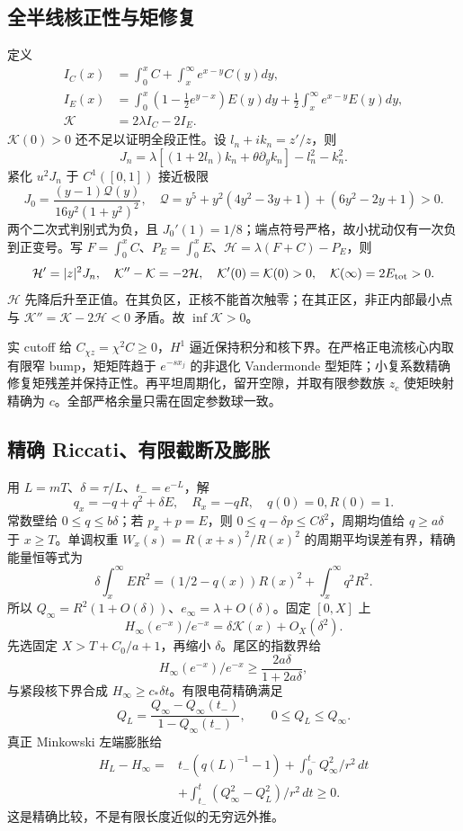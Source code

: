 \subsection{全半线核正性与矩修复}
定义
\begin{align*}
I_C(x)&=\int_0^xC+\int_x^\infty e^{x-y}C(y)dy,\\
I_E(x)&=\int_0^x(1-\tfrac12e^{y-x})E(y)dy
+\tfrac12\int_x^\infty e^{x-y}E(y)dy,\\
\mathcal K&=2\lambda I_C-2I_E.
\end{align*}
$\mathcal K(0)>0$ 还不足以证明全段正性。设 $l_n+ik_n=z'/z$，则
\[
J_n=\lambda[(1+2l_n)k_n+\theta\partial_yk_n]-l_n^2-k_n^2.
\]
紧化 $u^2J_n$ 于 $C^1([0,1])$ 接近极限
\[
J_0=\frac{(y-1)\mathcal Q(y)}{16y^2(1+y^2)^2},\quad
\mathcal Q=y^5+y^2(4y^2-3y+1)+(6y^2-2y+1)>0.
\]
两个二次式判别式为负，且 $J_0'(1)=1/8$；端点符号严格，故小扰动仅有一次负到正变号。写 $F=\int_0^xC$、$P_E=\int_0^xE$、$\mathcal H=\lambda(F+C)-P_E$，则
\[
\mathcal H'=|z|^2J_n,\quad
\mathcal K''-\mathcal K=-2\mathcal H,\quad
\mathcal K'(0)=\mathcal K(0)>0,
\quad\mathcal K(\infty)=2E_{\rm tot}>0.
\]
$\mathcal H$ 先降后升至正值。在其负区，正核不能首次触零；在其正区，非正内部最小点与 $\mathcal K''=\mathcal K-2\mathcal H<0$ 矛盾。故 $\inf\mathcal K>0$。

实 cutoff 给 $C_{\chi z}=\chi^2C\ge0$，$H^1$ 逼近保持积分和核下界。在严格正电流核心内取有限窄 bump，矩矩阵趋于 $e^{-sx_j}$ 的非退化 Vandermonde 型矩阵；小复系数精确修复矩残差并保持正性。再平坦周期化，留开空隙，并取有限参数族 $z_c$ 使矩映射精确为 $c$。全部严格余量只需在固定参数球一致。

\subsection{精确 Riccati、有限截断及膨胀}
用 $L=mT$、$\delta=\tau/L$、$t_-=e^{-L}$，解
\[
q_x=-q+q^2+\delta E,\quad R_x=-qR,
\quad q(0)=0,R(0)=1.
\]
常数壁给 $0\le q\le b\delta$；若 $p_x+p=E$，则
$0\le q-\delta p\le C\delta^2$，周期均值给 $q\ge a\delta$ 于 $x\ge T$。单调权重 $W_x(s)=R(x+s)^2/R(x)^2$ 的周期平均误差有界，精确能量恒等式为
\[
\delta\int_x^\infty ER^2=(1/2-q(x))R(x)^2+\int_x^\infty q^2R^2.
\]
所以 $Q_\infty=R^2(1+O(\delta))$、$e_\infty=\lambda+O(\delta)$。固定 $[0,X]$ 上
\[
H_\infty(e^{-x})/e^{-x}=\delta\mathcal K(x)+O_X(\delta^2).
\]
先选固定 $X>T+C_0/a+1$，再缩小 $\delta$。尾区的指数界给
\[
H_\infty(e^{-x})/e^{-x}\ge\frac{2a\delta}{1+2a\delta},
\]
与紧段核下界合成 $H_\infty\ge c_*\delta t$。有限电荷精确满足
\[
Q_L=\frac{Q_\infty-Q_\infty(t_-)}{1-Q_\infty(t_-)},\qquad
0\le Q_L\le Q_\infty.
\]
真正 Minkowski 左端膨胀给
\begin{align*}
H_L-H_\infty={}&t_-(q(L)^{-1}-1)
+\int_0^{t_-}Q_\infty^2/r^2\,dt\\
&+\int_{t_-}^t(Q_\infty^2-Q_L^2)/r^2\,dt\ge0.
\end{align*}
这是精确比较，不是有限长度近似的无穷远外推。

